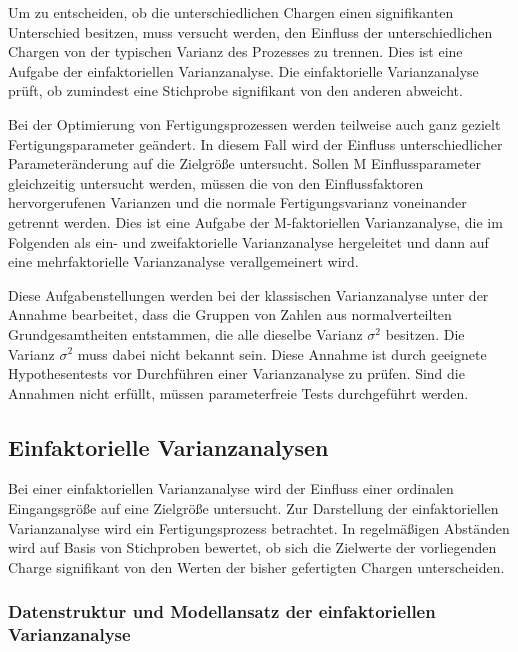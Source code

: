 \noindent Um zu entscheiden, ob die unterschiedlichen Chargen einen signifikanten Unterschied besitzen, muss versucht werden, den Einfluss der unterschiedlichen Chargen von der typischen Varianz des Prozesses zu trennen. Dies ist eine Aufgabe der einfaktoriellen Varianzanalyse. Die einfaktorielle Varianzanalyse pr\"{u}ft, ob zumindest eine Stichprobe signifikant von den anderen abweicht. \newline

\noindent Bei der Optimierung von Fertigungsprozessen werden teilweise auch ganz gezielt Fertigungsparameter ge\"{a}ndert. In diesem Fall wird der Einfluss unterschiedlicher Parameter\"{a}nderung auf die Zielgr\"{o}{\ss}e untersucht. Sollen M Einflussparameter gleichzeitig untersucht werden, m\"{u}ssen die von den Einflussfaktoren hervorgerufenen Varianzen und die normale Fertigungsvarianz voneinander getrennt werden. Dies ist eine Aufgabe der M-faktoriellen Varianzanalyse, die im Folgenden als ein- und zweifaktorielle Varianzanalyse hergeleitet und dann auf eine mehrfaktorielle Varianzanalyse verallgemeinert wird.

\clearpage

\noindent Diese Aufgabenstellungen werden bei der klassischen Varianzanalyse unter der Annahme bearbeitet, dass die Gruppen von Zahlen aus normalverteilten Grundgesamtheiten entstammen, die alle dieselbe Varianz $\sigma^{2}$ besitzen. Die Varianz $\sigma^{2}$ muss dabei nicht bekannt sein. Diese Annahme ist durch geeignete Hypothesentests vor Durchf\"{u}hren einer Varianzanalyse zu pr\"{u}fen. Sind die Annahmen nicht erf\"{u}llt, m\"{u}ssen parameterfreie Tests durchgef\"{u}hrt werden. 

\subsection{Einfaktorielle Varianzanalysen}

\noindent Bei einer einfaktoriellen Varianzanalyse wird der Einfluss einer ordinalen Eingangsgr\"{o}{\ss}e auf eine Zielgr\"{o}{\ss}e untersucht. Zur Darstellung der einfaktoriellen Varianzanalyse wird ein Fertigungsprozess betrachtet. In regelm\"{a}{\ss}igen Abst\"{a}nden wird auf Basis von Stichproben bewertet, ob sich die Zielwerte der vorliegenden Charge signifikant von den Werten der bisher gefertigten Chargen unterscheiden.

\subsubsection{Datenstruktur und Modellansatz der einfaktoriellen Varianzanalyse}

